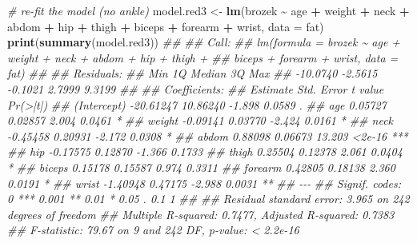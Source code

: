 \documentclass[
]{book}
\newenvironment{Shaded}{\begin{snugshade}}{\end{snugshade}}
\newcommand{\CommentTok}[1]{\textcolor[rgb]{0.56,0.35,0.01}{\textit{#1}}}
\newcommand{\DataTypeTok}[1]{\textcolor[rgb]{0.13,0.29,0.53}{#1}}
\newcommand{\KeywordTok}[1]{\textcolor[rgb]{0.13,0.29,0.53}{\textbf{#1}}}
\newcommand{\NormalTok}[1]{#1}
\newcommand{\OperatorTok}[1]{\textcolor[rgb]{0.81,0.36,0.00}{\textbf{#1}}}
\newcommand{\StringTok}[1]{\textcolor[rgb]{0.31,0.60,0.02}{#1}}
\theoremstyle{definition}
\theoremstyle{definition}
\theoremstyle{definition}
\theoremstyle{remark}
\begin{document}
\begin{Shaded}
\begin{Highlighting}[]
\CommentTok{\# re{-}fit the model (no ankle)}
\NormalTok{model.red3 \textless{}{-}}\StringTok{ }\KeywordTok{lm}\NormalTok{(brozek }\OperatorTok{\textasciitilde{}}\StringTok{ }\NormalTok{age }\OperatorTok{+}\StringTok{ }\NormalTok{weight }\OperatorTok{+}\StringTok{ }\NormalTok{neck }\OperatorTok{+}\StringTok{ }\NormalTok{abdom }\OperatorTok{+}\StringTok{ }\NormalTok{hip }\OperatorTok{+}\StringTok{ }\NormalTok{thigh  }\OperatorTok{+}\StringTok{ }\NormalTok{biceps }\OperatorTok{+}\StringTok{ }\NormalTok{forearm }\OperatorTok{+}\StringTok{ }\NormalTok{wrist, }\DataTypeTok{data =}\NormalTok{ fat)}
\KeywordTok{print}\NormalTok{(}\KeywordTok{summary}\NormalTok{(model.red3))}
\CommentTok{\#\# }
\CommentTok{\#\# Call:}
\CommentTok{\#\# lm(formula = brozek \textasciitilde{} age + weight + neck + abdom + hip + thigh + }
\CommentTok{\#\#     biceps + forearm + wrist, data = fat)}
\CommentTok{\#\# }
\CommentTok{\#\# Residuals:}
\CommentTok{\#\#      Min       1Q   Median       3Q      Max }
\CommentTok{\#\# {-}10.0740  {-}2.5615  {-}0.1021   2.7999   9.3199 }
\CommentTok{\#\# }
\CommentTok{\#\# Coefficients:}
\CommentTok{\#\#              Estimate Std. Error t value Pr(\textgreater{}|t|)    }
\CommentTok{\#\# (Intercept) {-}20.61247   10.86240  {-}1.898   0.0589 .  }
\CommentTok{\#\# age           0.05727    0.02857   2.004   0.0461 *  }
\CommentTok{\#\# weight       {-}0.09141    0.03770  {-}2.424   0.0161 *  }
\CommentTok{\#\# neck         {-}0.45458    0.20931  {-}2.172   0.0308 *  }
\CommentTok{\#\# abdom         0.88098    0.06673  13.203   \textless{}2e{-}16 ***}
\CommentTok{\#\# hip          {-}0.17575    0.12870  {-}1.366   0.1733    }
\CommentTok{\#\# thigh         0.25504    0.12378   2.061   0.0404 *  }
\CommentTok{\#\# biceps        0.15178    0.15587   0.974   0.3311    }
\CommentTok{\#\# forearm       0.42805    0.18138   2.360   0.0191 *  }
\CommentTok{\#\# wrist        {-}1.40948    0.47175  {-}2.988   0.0031 ** }
\CommentTok{\#\# {-}{-}{-}}
\CommentTok{\#\# Signif. codes:  0 \textquotesingle{}***\textquotesingle{} 0.001 \textquotesingle{}**\textquotesingle{} 0.01 \textquotesingle{}*\textquotesingle{} 0.05 \textquotesingle{}.\textquotesingle{} 0.1 \textquotesingle{} \textquotesingle{} 1}
\CommentTok{\#\# }
\CommentTok{\#\# Residual standard error: 3.965 on 242 degrees of freedom}
\CommentTok{\#\# Multiple R{-}squared:  0.7477,	Adjusted R{-}squared:  0.7383 }
\CommentTok{\#\# F{-}statistic: 79.67 on 9 and 242 DF,  p{-}value: \textless{} 2.2e{-}16}


\end{Highlighting}
\end{Shaded}
\end{document}
